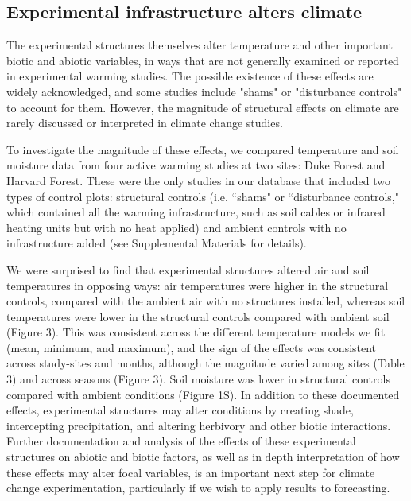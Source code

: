 \documentclass{article}
\begin{document}
\subsection* {Experimental infrastructure alters climate}
The experimental structures themselves alter temperature and other important biotic and abiotic variables, in ways that are not generally examined or reported in experimental warming studies. The possible existence of these effects are widely acknowledged, and some studies include "shams" or "disturbance controls" to account for them. However, the magnitude of structural effects on climate are rarely discussed or interpreted in climate change studies.
\par To investigate the magnitude of these effects, we compared temperature and soil moisture data from four active warming studies at two sites: Duke Forest and Harvard Forest\citep{farnsworth1995,clark2014a, marchin2015, pelini2011}. These were the only studies in our database that included two types of control plots: structural controls (i.e. ``shams" or ``disturbance controls," which contained all the warming infrastructure, such as soil cables or infrared heating units but with no heat applied) and ambient controls with no infrastructure added (see Supplemental Materials for details).  
\par We were surprised to find that experimental structures altered air and soil temperatures in opposing ways:  air temperatures were higher in the structural controls, compared with the ambient air with no structures installed, whereas soil temperatures were lower in the structural controls compared with ambient soil (Figure 3). This was consistent across the different temperature models we fit (mean, minimum, and maximum), and the sign of the effects was consistent across study-sites and months, although the magnitude varied among sites (Table 3) and across seasons (Figure 3). Soil moisture was lower in structural controls compared with ambient conditions (Figure 1S). In addition to these documented effects, experimental structures may alter conditions by creating shade, intercepting precipitation, and altering herbivory and other biotic interactions. Further documentation and analysis of the effects of these experimental structures on abiotic and biotic factors, as well as in depth interpretation of how these effects may alter focal variables, is an important next step for climate change experimentation, particularly if we wish to apply results to forecasting.
\end{document}
